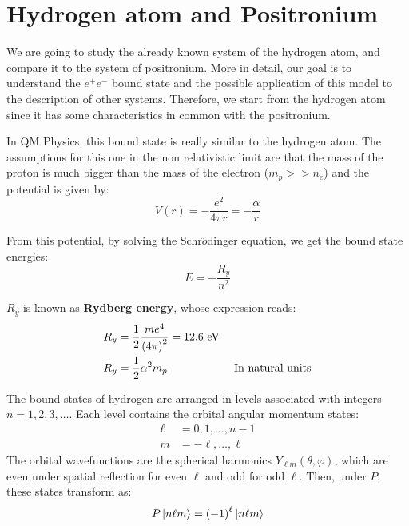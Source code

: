 \documentclass[../../main/main.tex]{subfiles}
\begin{document}
\section{Hydrogen atom and Positronium}
We are going to study the already known system of the hydrogen atom, and compare it to the system of positronium. More in detail, our goal is to understand the \( e^+ e^- \) bound state and the possible application of this model to the description of other systems. Therefore, we start from the hydrogen atom since it has some characteristics in common with the positronium.

In QM Physics, this bound state is really similar to the hydrogen atom. The assumptions for this one in the non relativistic limit are that the mass of the proton is much bigger than the mass of the electron (\( m_p >> n_e \)) and the potential is given by:
\begin{equation}
    V(r)
    =
    - \frac{e^2}{4 \pi r}
    =
    - \frac{\alpha}{r}
    \label{eq:L02_HAP}
\end{equation}

From this potential, by solving the Schr$\ddot{o}$dinger equation, we get the bound state energies:
\begin{equation}
    E
    =
    - \frac{R_y}{n^2}
    \label{eq:L02_HAE}
\end{equation}

\( R_y \) is known as \textbf{Rydberg energy}, whose expression reads:
\begin{align}
    R_y &= \frac{1}{2} \frac{me^4}{\qty(4\pi)^2} = 12.6 \ \si{eV} \label{eq:L02_HARE} \\
    R_y &= \frac{1}{2} \alpha^2 m_p \qquad \qquad \qquad \text{In natural units} \label{eq:L02_HARENU}
\end{align}

The bound states of hydrogen are arranged in levels associated with integers \( n = 1,2,3, \dots \). Each level contains the orbital angular momentum states:
\begin{equation}
    \begin{aligned}
        \ell &= 0, 1, \dots, n-1 \\
        m    &= -\ell, \dots, \ell
    \end{aligned}
    \label{eq:L02_HAREMS}
\end{equation}
The orbital wavefunctions are the spherical harmonics \( Y_{\ell m}(\theta, \varphi) \), which are even under spatial reflection for even \( \ell \) and odd for odd \( \ell \). Then, under \( P \), these states transform as:
\begin{equation}
    P \ket{n \ell m} = \qty(-1)^{\ell} \ket{n \ell m}
    \label{eq:L02_HAWFP}
\end{equation}
\end{document}

